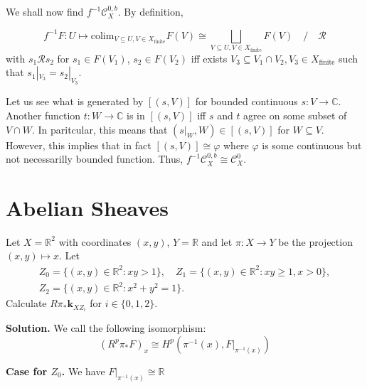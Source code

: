 \documentclass{category-template}
\begin{document}
We shall now find $f^{-1}\mathcal{C}_X^{0,b}$. By definition,

\begin{equation*}
    f^{-1}F: U \mapsto \text{colim}_{V \subseteq U, V \in X_{\text{finite}}}F(V) \cong \bigsqcup_{V \subseteq U, V \in X_{\text{finite}}}F(V) \quad / \quad \mathcal{R}
\end{equation*}
with $s_1\mathcal{R}s_2$ for $s_1 \in F(V_1)$, $s_2 \in F(V_2)$ iff exists $V_3
\subseteq V_1 \cap V_2, V_3 \in X_{\text{finite}}$ such that $s_1|_{V_3}=s_2|_{V_3}$.

Let us see what is generated by $[(s,V)]$ for bounded continuous $s: V \to
\mathbb{C}$. Another function $t: W \to \mathbb{C}$ is in $[(s,V)]$ iff $s$ and
$t$ agree on some subset of $V \cap W$. In paritcular, this means that $(s|_W,
W) \in [(s,V)]$ for $W \subseteq V$. However, this implies that in fact $[(s,V)]
\cong \varphi$ where $\varphi$ is some continuous but not necessarilly bounded
function. Thus, $\boxed{f^{-1}\mathcal{C}_X^{0,b} \cong \mathcal{C}_X^{0}}$.

\section{Abelian Sheaves}

\begin{problem}[Exercise 1.7]
    Let $X=\mathbb{R}^2$ with coordinates $(x,y)$, $Y=\mathbb{R}$ and let 
    $\pi: X \to Y$ be the projection $(x,y) \mapsto x$. Let
    \begin{gather*}
        Z_0 = \{(x,y) \in \mathbb{R}^2: xy>1\}, \quad Z_1 = \{(x,y) \in \mathbb{R}^2: xy \geq 1,x>0\}, \\
        Z_2 = \{(x,y) \in \mathbb{R}^2: x^2+y^2=1\}.
    \end{gather*}
    Calculate $R\pi_*\mathbf{k}_{XZ_i}$ for $i \in \{0,1,2\}$.
\end{problem}

\textbf{Solution.} We call the following isomorphism:
\begin{equation*}
    (R^p\pi_*F)_x \cong H^p(\pi^{-1}(x), F|_{\pi^{-1}(x)})
\end{equation*}

\textbf{Case for $Z_0$.} We have $F|_{\pi^{-1}(x)} \cong \mathbb{R}$
\end{document}
